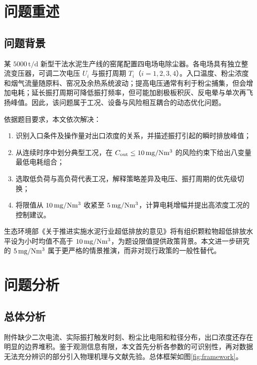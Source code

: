 \section{问题重述}

\subsection{问题背景}

某 $5000\,\mathrm{t/d}$ 新型干法水泥生产线的窑尾配置四电场电除尘器。各电场具有独立整流变压器，可调二次电压 $U_i$ 与振打周期 $T_i$（$i=1,2,3,4$）。入口温度、粉尘浓度和烟气流量随原料、窑况及余热系统波动；提高电压通常有利于粉尘捕集，但会增加电耗；延长振打周期可降低振打频率，但可能加剧极板积灰、反电晕与单次再飞扬峰值。因此，该问题属于工况、设备与风险相互耦合的动态优化问题。

依据题目要求，本文依次解决：

\begin{enumerate}
  \item 识别入口条件及操作量对出口浓度的关系，并描述振打引起的瞬时排放峰值；
  \item 从连续时序中划分典型工况，在 $C_{\mathrm{out}}\le 10\,\mathrm{mg/Nm^3}$ 的风险约束下给出八变量最低电耗组合；
  \item 选取低负荷与高负荷代表工况，解释策略差异及电压、振打周期的优先级切换；
  \item 将限值从 $10\,\mathrm{mg/Nm^3}$ 收紧至 $5\,\mathrm{mg/Nm^3}$，计算电耗增幅并提出高浓度工况的控制建议。
\end{enumerate}

生态环境部《关于推进实施水泥行业超低排放的意见》将有组织颗粒物超低排放水平设为小时均值不高于 $10\,\mathrm{mg/Nm^3}$，为题设限值提供政策背景\cite{mee2024opinion,mee2024qa}。本文进一步研究的 $5\,\mathrm{mg/Nm^3}$ 属于更严格的情景推演，而非对现行政策的一般性替代。

\section{问题分析}

\subsection{总体分析}

附件缺少二次电流、实际振打触发时刻、粉尘比电阻和粒径分布，出口浓度还存在明显的边界堆积。鉴于观测信息有限，本文首先分析各参数的可识别性，再对数据无法充分辨识的部分引入物理机理与文献先验。总体框架如图\ref{fig:framework}。

